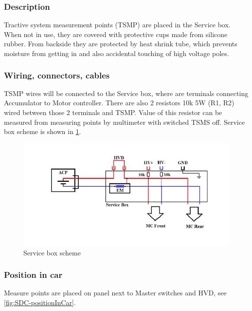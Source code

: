 \subsubsection{Description}

Tractive system measurement points (TSMP) are placed in the Service box. When not in use, they are covered with protective cups made from silicone rubber. From backside they are protected by heat shrink tube, which prevents moisture from getting in and also accidental touching of high voltage poles.

\subsubsection{Wiring, connectors, cables}

TSMP wires will be connected to the Service box, where are terminals connecting Accumulator to Motor controller. There are also 2 resistors 10k 5W (R1, R2) wired between those 2 terminals and TSMP. Value of this resistor can be measured from measuring points by multimeter with switched TSMS off. Service box scheme is shown in \ref{fig:ServiceBox/scheme}.

\begin{figure}[H]
	\includegraphics[width=\textwidth]{./img/ServiceBox-scheme.jpg}
	\caption{Service box scheme}
	\label{fig:ServiceBox/scheme}
\end{figure}

\subsubsection{Position in car}

Measure points are placed on panel next to Master switches and HVD, see \ref{fig:SDC-positionInCar}.